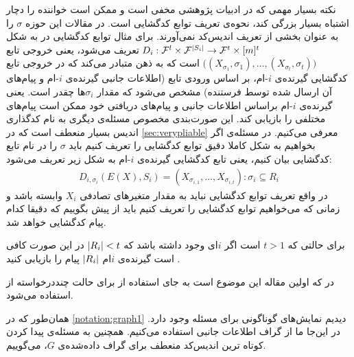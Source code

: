 \begin{remark}
	\label{remark:pliablevsvery}
	نکته بسیار مهمی که در ادبیات پژوهشی 
	\picod
	مخفی است و ممکن است خواننده را دچار اشتباه بسیار بزرگی کند، نحوه‌ی تعریف توابع کدگشایی است. در مقالات این حوزه
	$\sigma$
	را به عنوان بخشی از تعریف اندیس‌کد نمی‌آورند. برای مثال توابع کدگشایی در
	\cite{song2017polynomialtime}
	به شکل
	$D_i: \mathcal{F}^l \times \mathcal{F}^{\left|{S_i}\right|} \rightarrow \mathcal{F}^t \times [m]^t$
	تعریف می‌شود، یعنی خروجی تابع
	$\big((X_{\sigma_1}, \sigma_1), \ldots, (X_{\sigma_t}, \sigma_t) \big)$
	است که به ذهن متبادر می‌کند که در خروجی تابع کدگشایی گیرنده‌ی 
	$i$-ام،
	 بر اساس ورودی تابع (اطلاعات جانبی گیرنده‌ی 
	$i$-ام
	و پیام‌های آن ارسال شده توسط فرستنده) مشخص می‌شود که مقدار
	$\sigma_i$ها 
 چقدر است. یعنی گیرنده‌ی
	$i$-ام
	 براساس اطلاعات جانبی و پیام‌های دریافتی خود ممکن است پیام‌های مختلفی را بازیابی کند. این صورت‌بندی مخصوص مسئله‌ی دیگری به نام کدگذاری اندیس بسیار منعطف است که در
	\autoref{sec:verypliable}
	معرفی می‌کنیم. در مسئله‌ی
	\picod
	اگر بخواهیم به شکل کاملا دقیق توابع کدگشایی را تعریف کنیم باید 
	$\sigma$
	 را در نام تابع کدگشایی بیان کنیم، یعنی تابع کدگشایی گیرنده‌ی
	 $i$-ام
    به شکل زیر تعریف می‌شود:
	 	\begin{align}
	 	D_{i, \sigma_i}(E(X), S_i) = (X_{\sigma_{i,1}}, \ldots, X_{\sigma_{i,t}}): \sigma_i \subseteq R_i
	 	\end{align}
	 	در واقع تعریف توابع کدگشایی نباید به مقدار متغیرهای تصادفی
	 	$X_i$
	 	وابسته باشد و زمانی که می‌خواهیم توابع کدگشایی را تعریف کنیم باید از پیش بگوییم که دقیقا کدام پیام کدگشایی خواهد شد.
\end{remark}

\begin{note}
	برای حالتی که
	$t > 1$
	است اگر
	$i$ای وجود داشته باشد که
	$\left|{R_i}\right| < t$
	در این صورت کافی است گیرنده‌ی 
	$i$ام
	$\left|{R_i}\right|$
	پیام را بازیابی کنید \cite{pliablefirstpaper}.
\end{note}

\begin{note}
	در 
	\cite{pliablefirstpaper}
	که اولین مقاله این موضوع است به جای استفاده از
	\picodt
	برای حالت چنددرخواسته از
	استفاده می‌شود.
\end{note}
\begin{notation}
	همان‌طور که در
	\autoref{notation:graph1}
	دیدیم نمایش‌های گوناگونی برای مسئله وجود دارد. در این‌جا ما از گراف اطلاعات جانبی استفاده می‌کنیم. همچنین به مسئله‌ی پیدا کردن کوتاه ترین اندیس‌کد منعطف برای گراف داده‌شده‌ی 
	$G$،
	\picodg
	می‌گوییم.
\end{notation}

